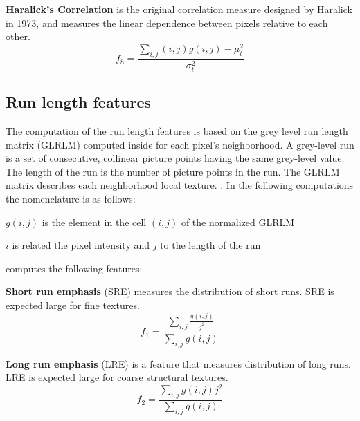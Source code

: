\documentclass{InsightArticle}
\begin{document}
\textbf{Haralick's Correlation} is the original correlation measure designed by Haralick in 1973, and measures the linear dependence between pixels relative to each other. 
\begin{equation} \label{eqn:ShapeInfluenceTerm}
f_8 = \frac{\sum_{i,j}\nolimits (i,j)g(i,j)-\mu _t^2}{\sigma _t^2}
\end{equation}

\subsection{Run length features}
\label{sec:RLFeat}

The computation of the run length features is based on the grey level run length matrix (GLRLM) computed inside  for each pixel's neighborhood. A grey-level run is a set of consecutive, collinear picture points having the same grey-level value. The length of the run is the number of picture points in the run. The GLRLM matrix describes each neighborhood local texture. \cite{RLFeat1,RLFeat2,RLFeat3,RLFeat4}. In the following computations the nomenclature is as follows:

\begin{math} g(i,j) \end{math} is the element in the cell \begin{math}(i,j)\end{math} of the normalized GLRLM

\begin{math} i \end{math} is related the pixel intensity and \begin{math} j \end{math} to the length of the run

 computes the following features:

\textbf{Short run emphasis} (SRE) measures the distribution of short runs. SRE is expected large for fine textures.
\begin{equation} \label{eqn:ShapeInfluenceTerm}
f_1 = \frac{\sum_{i,j}\nolimits \frac{g(i, j)}{j^2}}{\sum_{i,j}\nolimits g(i, j)}
\end{equation}

\textbf{Long run emphasis} (LRE) is a feature that measures distribution of long runs. LRE is expected large for coarse structural textures.
\begin{equation} \label{eqn:ShapeInfluenceTerm}
f_2 = \frac{\sum_{i,j}\nolimits g(i, j)j^2}{\sum_{i,j}\nolimits g(i, j)}
\end{equation}
\end{document}
